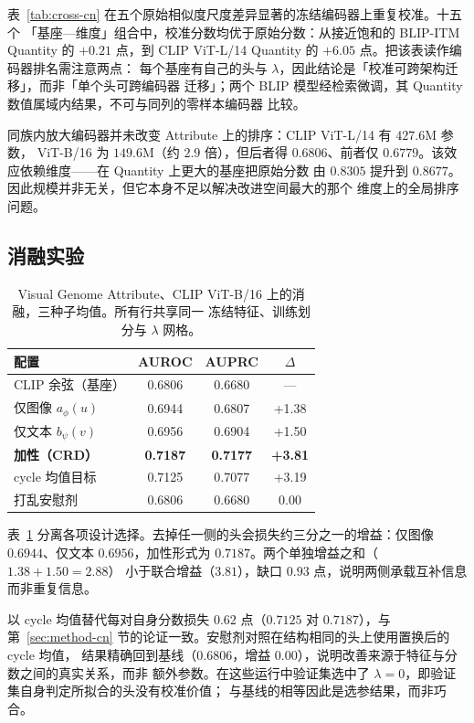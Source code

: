 \documentclass[10pt,twocolumn,a4paper]{ctexart}
\begin{document}
表~\ref{tab:cross-cn} 在五个原始相似度尺度差异显著的冻结编码器上重复校准。十五个
「基座—维度」组合中，校准分数均优于原始分数：从接近饱和的 BLIP-ITM Quantity 的
$+0.21$ 点，到 CLIP ViT-L/14 Quantity 的 $+6.05$ 点。把该表读作编码器排名需注意两点：
每个基座有自己的头与 $\lambda$，因此结论是「校准可跨架构迁移」，而非「单个头可跨编码器
迁移」；两个 BLIP 模型经检索微调，其 Quantity 数值属域内结果，不可与同列的零样本编码器
比较。

同族内放大编码器并未改变 Attribute 上的排序：CLIP ViT-L/14 有 $427.6$M 参数，
ViT-B/16 为 $149.6$M（约 $2.9$ 倍），但后者得 $0.6806$、前者仅 $0.6779$。该效应依赖维度——在 Quantity 上更大的基座把原始分数
由 $0.8305$ 提升到 $0.8677$。因此规模并非无关，但它本身不足以解决改进空间最大的那个
维度上的全局排序问题。

\subsection{消融实验}
\begin{table}[t]
\centering
\small
\setlength{\tabcolsep}{5pt}
\caption{Visual Genome Attribute、CLIP ViT-B/16 上的消融，三种子均值。所有行共享同一
冻结特征、训练划分与 $\lambda$ 网格。}
\label{tab:ablation-cn}
\begin{tabular}{lccc}
\toprule
配置 & AUROC & AUPRC & $\Delta$ \\
\midrule
CLIP 余弦（基座） & 0.6806 & 0.6680 & --- \\
仅图像 $a_\phi(u)$ & 0.6944 & 0.6807 & +1.38 \\
仅文本 $b_\psi(v)$ & 0.6956 & 0.6904 & +1.50 \\
\textbf{加性（CRD）} & \textbf{0.7187} & \textbf{0.7177} & \textbf{+3.81} \\
cycle 均值目标 & 0.7125 & 0.7077 & +3.19 \\
打乱安慰剂 & 0.6806 & 0.6680 & 0.00 \\
\bottomrule
\end{tabular}
\end{table}

表~\ref{tab:ablation-cn} 分离各项设计选择。去掉任一侧的头会损失约三分之一的增益：仅图像
$0.6944$、仅文本 $0.6956$，加性形式为 $0.7187$。两个单独增益之和（$1.38+1.50=2.88$）
小于联合增益（$3.81$），缺口 $0.93$ 点，说明两侧承载互补信息而非重复信息。

以 cycle 均值替代每对自身分数损失 $0.62$ 点（$0.7125$ 对 $0.7187$），与
第~\ref{sec:method-cn} 节的论证一致。安慰剂对照在结构相同的头上使用置换后的 cycle 均值，
结果精确回到基线（$0.6806$，增益 $0.00$），说明改善来源于特征与分数之间的真实关系，而非
额外参数。在这些运行中验证集选中了 $\lambda=0$，即验证集自身判定所拟合的头没有校准价值；
与基线的相等因此是选参结果，而非巧合。
\end{document}
